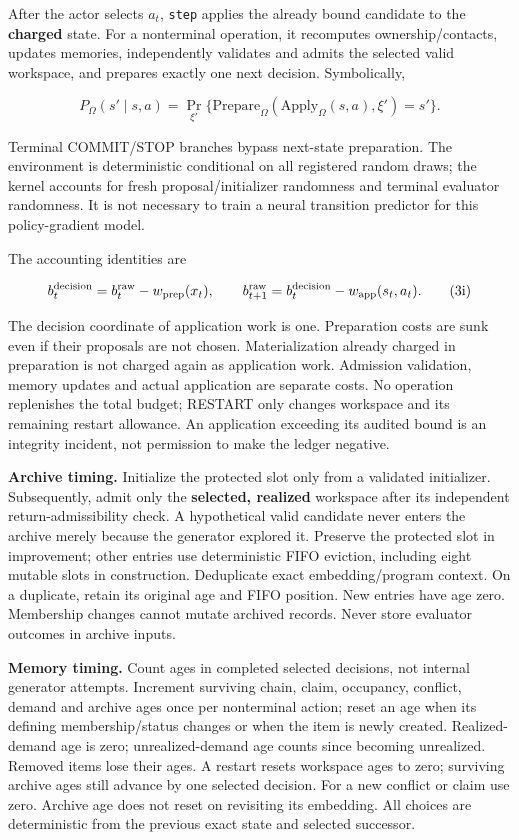 \documentclass[10pt,a4paper]{article}
\begin{document}
After the actor selects \(a_t\), \texttt{step} applies the already bound
candidate to the \textbf{charged} state. For a nonterminal operation, it
recomputes ownership/contacts, updates memories, independently validates
and admits the selected valid workspace, and prepares exactly one next
decision. Symbolically,

\[
P_\Omega(s'\mid s,a)=
\Pr_{\xi'}\{\mathrm{Prepare}_\Omega(\mathrm{Apply}_\Omega(s,a),\xi')=s'\}.
\tag{3h}
\]

Terminal COMMIT/STOP branches bypass next-state preparation. The
environment is deterministic conditional on all registered random draws;
the kernel accounts for fresh proposal/initializer randomness and
terminal evaluator randomness. It is not necessary to train a neural
transition predictor for this policy-gradient model.

The accounting identities are

\[
b_t^{\rm decision}=b_t^{\rm raw}-w_{\rm prep}(x_t),\qquad
b_{t+1}^{\rm raw}=b_t^{\rm decision}-w_{\rm app}(s_t,a_t).
\tag{3i}
\]

The decision coordinate of application work is one. Preparation costs
are sunk even if their proposals are not chosen. Materialization already
charged in preparation is not charged again as application work.
Admission validation, memory updates and actual application are separate
costs. No operation replenishes the total budget; RESTART only changes
workspace and its remaining restart allowance. An application exceeding
its audited bound is an integrity incident, not permission to make the
ledger negative.

\textbf{Archive timing.} Initialize the protected slot only from a
validated initializer. Subsequently, admit only the \textbf{selected,
realized} workspace after its independent return-admissibility check. A
hypothetical valid candidate never enters the archive merely because the
generator explored it. Preserve the protected slot in improvement; other
entries use deterministic FIFO eviction, including eight mutable slots
in construction. Deduplicate exact embedding/program context. On a
duplicate, retain its original age and FIFO position. New entries have
age zero. Membership changes cannot mutate archived records. Never store
evaluator outcomes in archive inputs.

\textbf{Memory timing.} Count ages in completed selected decisions, not
internal generator attempts. Increment surviving chain, claim,
occupancy, conflict, demand and archive ages once per nonterminal
action; reset an age when its defining membership/status changes or when
the item is newly created. Realized-demand age is zero;
unrealized-demand age counts since becoming unrealized. Removed items
lose their ages. A restart resets workspace ages to zero; surviving
archive ages still advance by one selected decision. For a new conflict
or claim use zero. Archive age does not reset on revisiting its
embedding. All choices are deterministic from the previous exact state
and selected successor.
\end{document}
